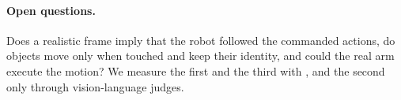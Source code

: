 \paragraph{Open questions.}
Does a realistic frame imply that the robot followed the commanded actions, do objects move only when touched and keep their identity, and could the real arm execute the motion?
We measure the first and the third with \ours{}, and the second only through vision-language judges.

